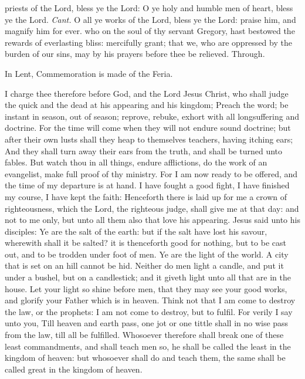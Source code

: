 \introit
{} priests of the Lord, bless ye the Lord: O ye holy and humble
men of heart, bless ye the Lord. \textit{Cant.} O all ye works of the Lord, bless ye the Lord: praise him, and magnify him for ever.
\collect
{} who on the soul of thy servant Gregory, hast bestowed the rewards of everlasting bliss: mercifully grant; that we, who are oppressed by the burden of our sins, may by his prayers before thee be relieved. Through.
\begin{rubric}
    In Lent, Commemoration is made of the Feria.%
\end{rubric}
 I charge thee therefore before God, and the Lord Jesus Christ, who shall judge the quick and the dead at his appearing and his kingdom; Preach the word; be instant in season, out of season; reprove, rebuke, exhort with all longsuffering and doctrine. For the time will come when they will not endure sound doctrine; but after their own lusts shall they heap to themselves teachers, having itching ears; And they shall turn away their ears from the truth, and shall be turned unto fables. But watch thou in all things, endure afflictions, do the work of an evangelist, make full proof of thy ministry. For I am now ready to be offered, and the time of my departure is at hand. I have fought a good fight, I have finished my course, I have kept the faith: Henceforth there is laid up for me a crown of righteousness, which the Lord, the righteous judge, shall give me at that day: and not to me only, but unto all them also that love his appearing.
 Jesus said unto his disciples: Ye are the salt of the earth: but if the salt have lost his savour, wherewith shall it be salted? it is thenceforth good for nothing, but to be cast out, and to be trodden under foot of men. Ye are the light of the world. A city that is set on an hill cannot be hid. Neither do men light a candle, and put it under a bushel, but on a candlestick; and it giveth light unto all that are in the house. Let your light so shine before men, that they may see your good works, and glorify your Father which is in heaven. Think not that I am come to destroy the law, or the prophets: I am not come to destroy, but to fulfil. For verily I say unto you, Till heaven and earth pass, one jot or one tittle shall in no wise pass from the law, till all be fulfilled. Whosoever therefore shall break one of these least commandments, and shall teach men so, he shall be called the least in the kingdom of heaven: but whosoever shall do and teach them, the same shall be called great in the kingdom of heaven.
